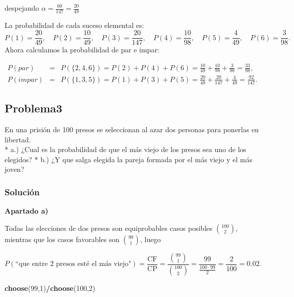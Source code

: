 \documentclass[
]{article}
\newenvironment{Shaded}{\begin{snugshade}}{\end{snugshade}}
\newcommand{\DecValTok}[1]{\textcolor[rgb]{0.00,0.00,0.81}{#1}}
\newcommand{\KeywordTok}[1]{\textcolor[rgb]{0.13,0.29,0.53}{\textbf{#1}}}
\newcommand{\NormalTok}[1]{#1}
\newcommand{\OperatorTok}[1]{\textcolor[rgb]{0.81,0.36,0.00}{\textbf{#1}}}
\begin{document}
despejando \(\alpha = \frac{60}{147} = \frac{20}{49}\)

La probabilidad de cada suceso elemental es: \[
P(1) = \frac{20}{49},\quad P(2) = \frac{10}{49}, \quad 
P(3) = \frac{20}{147}, \quad 
P(4) = \frac{10}{98}, \quad 
P(5) = \frac{4}{49}, \quad 
P(6) = \frac{3}{98}.
\] Ahora calculamos la probabilidad de par e impar:

\begin{eqnarray*}
P(par) &=& P(\{2,4,6\})=P(2) + P(4) + P(6) = \frac{10}{49} + \frac{10}{98} + \frac{3}{98} = \frac{33}{98}, \\
P(impar) &=&P(\{1,3,5\})= P(1) + P(3) + P(5) = \frac{20}{49} + \frac{20}{147} + \frac{4}{49} = \frac{92}{147}.
\end{eqnarray*}

\hypertarget{problema3}{%
\subsection{Problema3}\label{problema3}}

En una prisión de 100 presos se seleccionan al azar dos personas para
ponerlas en libertad.\\
* a.) ¿Cual es la probabilidad de que el más viejo de los presos sea uno
de los elegidos? * b.) ¿Y que salga elegida la pareja formada por el más
viejo y el más joven?

\hypertarget{soluciuxf3n-2}{%
\subsubsection{Solución}\label{soluciuxf3n-2}}

\textbf{Apartado a)}

Todas las elecciones de dos presos son equiprobables casos posibles
\({100\choose 2}\), mientras que los casos favorables son
\({99\choose 1}\), luego

\[P(\mbox{``que entre 2 presos esté el más viejo"})=\frac{\mbox{CF}}{\mbox{CP}}=
\frac{{99\choose 1}}{{100\choose 2}}=\frac{99}{\frac{ 100\cdot 99}{2}}=\frac{2}{100}=0.02.\]

\begin{Shaded}
\begin{Highlighting}[]
\KeywordTok{choose}\NormalTok{(}\DecValTok{99}\NormalTok{,}\DecValTok{1}\NormalTok{)}\OperatorTok{/}\KeywordTok{choose}\NormalTok{(}\DecValTok{100}\NormalTok{,}\DecValTok{2}\NormalTok{)}
\end{Highlighting}
\end{Shaded}
\end{document}
